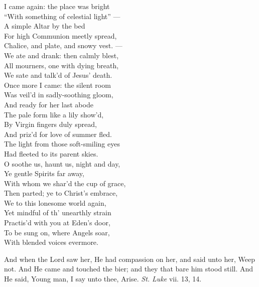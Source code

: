   I came again: the place was bright \\
 “With something of celestial light” — \\
 A simple Altar by the bed \\
 For high Communion meetly spread, \\
 Chalice, and plate, and snowy vest. — \\
 We ate and drank: then calmly blest, \\
 All mourners, one with dying breath, \\
 We sate and talk’d of Jesus’ death. \\
  Once more I came: the silent room \\
 Was veil’d in sadly-soothing gloom, \\
 And ready for her last abode \\
 The pale form like a lily show’d, \\
 By Virgin fingers duly spread, \\
 And priz’d for love of summer fled. \\
 The light from those soft-smiling eyes \\
 Had fleeted to its parent skies. \\
  O soothe us, haunt us, night and day, \\
 Ye gentle Spirits far away, \\
 With whom we shar’d the cup of grace, \\
 Then parted; ye to Christ’s embrace, \\
 We to this lonesome world again, \\
 Yet mindful of th’ unearthly strain \\
 Practis’d with you at Eden’s door, \\
 To be sung on, where Angels soar, \\
 With blended voices evermore.\\


And when the Lord saw her, He had compassion on her, and said unto her, Weep not. And He came and touched the bier; and they that bare him stood still. And He said, Young man, I say unto thee, Arise. \emph{St. Luke} vii. 13, 14.

